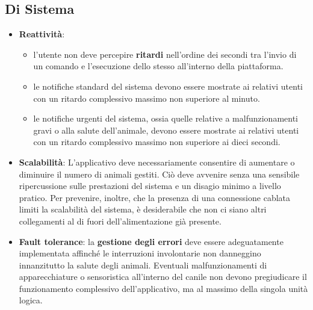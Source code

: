         \subsection{Di Sistema}
            \begin{itemize}
            \item \textbf{Reattività}: 
            \begin{itemize}
                \item l'utente non deve percepire \textbf{ritardi} nell'ordine dei secondi tra l'invio di un comando e l'esecuzione dello stesso all'interno della piattaforma. 
                \item le notifiche standard del sistema devono essere mostrate ai relativi utenti con un ritardo complessivo massimo non superiore al minuto.
                \item le notifiche urgenti del sistema, ossia quelle relative a malfunzionamenti gravi o alla salute dell'animale, devono essere mostrate ai relativi utenti con un ritardo complessivo massimo non superiore ai dieci secondi.
            \end{itemize}
            
            \item \textbf{Scalabilità}: L'applicativo deve necessariamente consentire di aumentare o diminuire il numero di animali gestiti. Ciò deve avvenire senza una sensibile ripercussione sulle prestazioni del sistema e un disagio minimo a livello pratico. Per prevenire, inoltre, che la presenza di una connessione cablata limiti la scalabilità del sistema, è desiderabile che non ci siano altri collegamenti al di fuori dell'alimentazione già presente. 
            
            \item \textbf{Fault tolerance}: la \textbf{gestione degli errori} deve essere adeguatamente implementata affinché le interruzioni involontarie non danneggino innanzitutto la salute degli animali.
            Eventuali malfunzionamenti di apparecchiature o sensoristica all'interno del canile non devono pregiudicare il funzionamento complessivo dell'applicativo, ma al massimo della singola unità logica. 
    \end{itemize}
        
